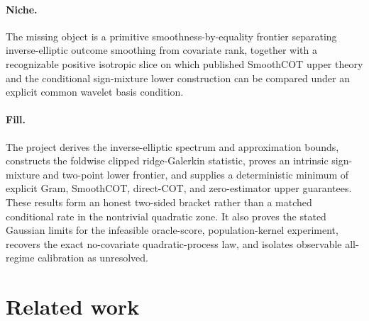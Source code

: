 \documentclass{article}
\begin{document}
\paragraph{Niche.} The missing object is a primitive smoothness-by-equality frontier separating inverse-elliptic outcome smoothing from covariate rank, together with a recognizable positive isotropic slice on which published SmoothCOT upper theory and the conditional sign-mixture lower construction can be compared under an explicit common wavelet basis condition.

\paragraph{Fill.} The project derives the inverse-elliptic spectrum and approximation bounds, constructs the foldwise clipped ridge-Galerkin statistic, proves an intrinsic sign-mixture and two-point lower frontier, and supplies a deterministic minimum of explicit Gram, SmoothCOT, direct-COT, and zero-estimator upper guarantees. These results form an honest two-sided bracket rather than a matched conditional rate in the nontrivial quadratic zone. It also proves the stated Gaussian limits for the infeasible oracle-score, population-kernel experiment, recovers the exact no-covariate quadratic-process law, and isolates observable all-regime calibration as unresolved.

\section{Related work}
\end{document}
